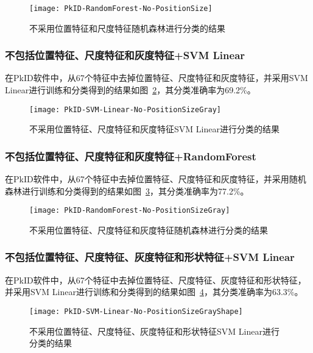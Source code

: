 \begin{figure}[!ht]
\centering
\texttt{[image: PkID-RandomForest-No-PositionSize]}
\caption{不采用位置特征和尺度特征随机森林进行分类的结果}
\label{fig:PkID-RandomForest-No-PositionSize}
\end{figure}

\subsubsection{不包括位置特征、尺度特征和灰度特征+SVM Linear}
在PkID软件中，从67个特征中去掉位置特征、尺度特征和灰度特征，并采用SVM Linear进行训练和分类得到的结果如图~\ref{fig:PkID-SVM-Linear-No-PositionSizeGray}，其分类准确率为69.2\%。

\begin{figure}[!ht]
\centering
\texttt{[image: PkID-SVM-Linear-No-PositionSizeGray]}
\caption{不采用位置特征、尺度特征和灰度特征SVM Linear进行分类的结果}
\label{fig:PkID-SVM-Linear-No-PositionSizeGray}
\end{figure}

\subsubsection{不包括位置特征、尺度特征和灰度特征+RandomForest}
在PkID软件中，从67个特征中去掉位置特征、尺度特征和灰度特征，并采用随机森林进行训练和分类得到的结果如图~\ref{fig:PkID-RandomForest-No-PositionSizeGray}，其分类准确率为77.2\%。

\begin{figure}[!ht]
\centering
\texttt{[image: PkID-RandomForest-No-PositionSizeGray]}
\caption{不采用位置特征、尺度特征和灰度特征随机森林进行分类的结果}
\label{fig:PkID-RandomForest-No-PositionSizeGray}
\end{figure}

\subsubsection{不包括位置特征、尺度特征、灰度特征和形状特征+SVM Linear}
在PkID软件中，从67个特征中去掉位置特征、尺度特征、灰度特征和形状特征，并采用SVM Linear进行训练和分类得到的结果如图~\ref{fig:PkID-SVM-Linear-No-PositionSizeGrayShape}，其分类准确率为63.3\%。

\begin{figure}[!ht]
\centering
\texttt{[image: PkID-SVM-Linear-No-PositionSizeGrayShape]}
\caption{不采用位置特征、尺度特征、灰度特征和形状特征SVM Linear进行分类的结果}
\label{fig:PkID-SVM-Linear-No-PositionSizeGrayShape}
\end{figure}

